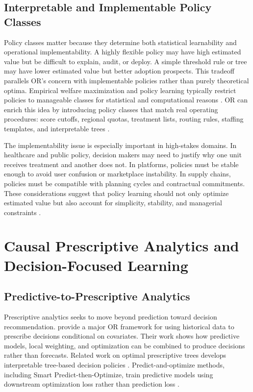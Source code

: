 \documentclass[11pt]{article}
\begin{document}
\subsection{Interpretable and Implementable Policy Classes}

Policy classes matter because they determine both statistical learnability and operational implementability. A highly flexible policy may have high estimated value but be difficult to explain, audit, or deploy. A simple threshold rule or tree may have lower estimated value but better adoption prospects. This tradeoff parallels OR's concern with implementable policies rather than purely theoretical optima. Empirical welfare maximization and policy learning typically restrict policies to manageable classes for statistical and computational reasons \citep{manski2004statistical,kitagawa2018treated}. OR can enrich this idea by introducing policy classes that match real operating procedures: score cutoffs, regional quotas, treatment lists, routing rules, staffing templates, and interpretable trees \citep{bertsimas2019optimal}.

The implementability issue is especially important in high-stakes domains. In healthcare and public policy, decision makers may need to justify why one unit receives treatment and another does not. In platforms, policies must be stable enough to avoid user confusion or marketplace instability. In supply chains, policies must be compatible with planning cycles and contractual commitments. These considerations suggest that policy learning should not only optimize estimated value but also account for simplicity, stability, and managerial constraints \citep{athey2021policy,fernandez2022causal}.

\section{Causal Prescriptive Analytics and Decision-Focused Learning}
\label{sec:prescriptive}

\subsection{Predictive-to-Prescriptive Analytics}

Prescriptive analytics seeks to move beyond prediction toward decision recommendation. \citet{bertsimas2020predictive} provide a major OR framework for using historical data to prescribe decisions conditional on covariates. Their work shows how predictive models, local weighting, and optimization can be combined to produce decisions rather than forecasts. Related work on optimal prescriptive trees develops interpretable tree-based decision policies \citep{bertsimas2019optimal}. Predict-and-optimize methods, including Smart Predict-then-Optimize, train predictive models using downstream optimization loss rather than prediction loss \citep{elmachtoub2022smart}.
\end{document}
